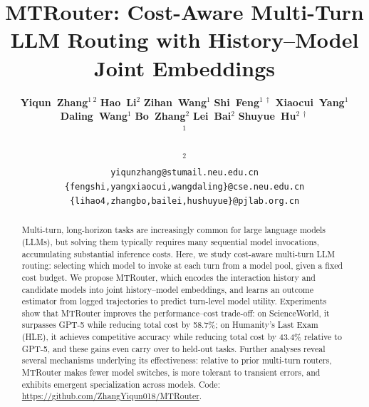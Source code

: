 \documentclass[11pt]{article}
\title{MTRouter: Cost-Aware Multi-Turn LLM Routing  with History–Model Joint Embeddings}
\author{
  \textbf{Yiqun~Zhang}$^{1~2}$ \quad 
  \textbf{Hao~Li}$^2$  \quad
  \textbf{Zihan~Wang}$^1$ \quad
  \textbf{Shi~Feng}$^{1~\dag}$
  \textbf{Xiaocui~Yang}$^1$ \quad \\
  \textbf{Daling~Wang}$^1$ \quad 
  \textbf{Bo~Zhang}$^2$ \quad 
  \textbf{Lei~Bai}$^{2}$ \quad
  \textbf{Shuyue~Hu}$^{2~\dag}$\\
  $^1$ \text{School of Computer Science and Engineering, Northeastern University} \\
  \text{Shenyang 110819, China} \\
  $^2$ \text{Shanghai Artificial Intelligence Laboratory} \\
  \texttt{yiqunzhang@stumail.neu.edu.cn} \\
  \texttt{\{fengshi,yangxiaocui,wangdaling\}@cse.neu.edu.cn} \\ 
  \texttt{\{lihao4,zhangbo,bailei,hushuyue\}@pjlab.org.cn}
}
\newcommand{\method}{MTRouter\xspace}
\newcommand{\github}{\url{https://github.com/ZhangYiqun018/MTRouter}\xspace}
\begin{document}
\maketitle
	\begin{abstract}
Multi-turn, long-horizon tasks are increasingly common for large language models (LLMs), but solving them typically requires many sequential model invocations, accumulating substantial inference costs. Here, we study cost-aware multi-turn LLM routing: selecting which model to invoke at each turn from a model pool, given a fixed cost budget. We propose MTRouter, which encodes the interaction history and candidate models into joint history–model embeddings, and learns an outcome estimator from logged trajectories to predict turn-level model utility. Experiments show that MTRouter improves the performance–cost trade-off: on ScienceWorld, it surpasses GPT-5 while reducing total cost by 58.7\%; on Humanity’s Last Exam (HLE), it achieves competitive accuracy while reducing total cost by 43.4\% relative to GPT-5, and these gains even carry over to held-out tasks. Further analyses reveal several mechanisms underlying its effectiveness: relative to prior multi-turn routers, MTRouter makes fewer model switches, is more tolerant to transient errors, and exhibits emergent specialization across models.
	Code: \github.
	\end{abstract}

\def\thefootnote{\dag}\def\thefootnote{\arabic{footnote}}
\end{document}
